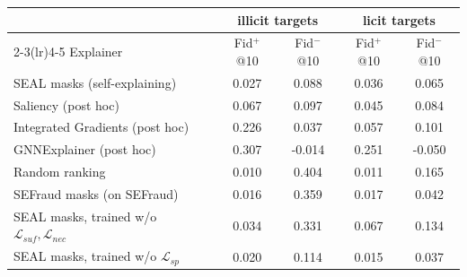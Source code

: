 \begin{tabular}{lcccc}
\toprule
 & \multicolumn{2}{c}{illicit targets} & \multicolumn{2}{c}{licit targets}\\
\cmidrule(lr){2-3}\cmidrule(lr){4-5}
Explainer & Fid$^{+}$@10 & Fid$^{-}$@10 & Fid$^{+}$@10 & Fid$^{-}$@10\\
\midrule
SEAL masks (self-explaining) & 0.027 & 0.088 & 0.036 & 0.065\\
Saliency (post hoc) & 0.067 & 0.097 & 0.045 & 0.084\\
Integrated Gradients (post hoc) & 0.226 & 0.037 & 0.057 & 0.101\\
GNNExplainer (post hoc) & 0.307 & -0.014 & 0.251 & -0.050\\
Random ranking & 0.010 & 0.404 & 0.011 & 0.165\\
SEFraud masks (on SEFraud) & 0.016 & 0.359 & 0.017 & 0.042\\
SEAL masks, trained w/o $\mathcal{L}_{suf},\mathcal{L}_{nec}$ & 0.034 & 0.331 & 0.067 & 0.134\\
SEAL masks, trained w/o $\mathcal{L}_{sp}$ & 0.020 & 0.114 & 0.015 & 0.037\\
\bottomrule
\end{tabular}

